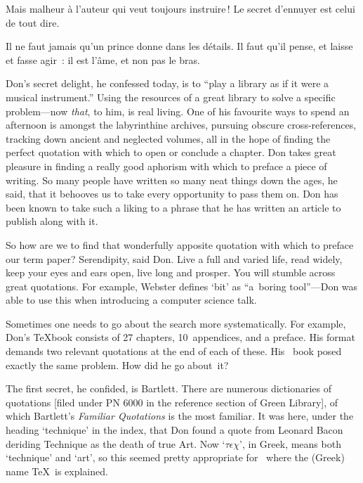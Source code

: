
\smallskip
{\narrower\smallskip\noindent
	Mais malheur \`a l'auteur qui veut toujours instruire$\,$!
	Le secret d'ennuyer est celui de tout dire.
\smallskip}


\smallskip
{\narrower\smallskip\noindent
	Il ne faut jamais qu'un prince donne dans les d\'etails.
	Il faut qu'il pense, et laisse et fasse agir~:
	il est l'\^ame, et non pas le bras.
\smallskip}


\medskip
\noindent
Don's secret delight, he confessed today, is to ``play a library as if
it were a musical instrument.'' Using the resources of a great library
to solve a specific problem---now {\it  that}, to him, is real living.
One of his favourite ways to spend an afternoon is amongst the
labyrinthine archives, pursuing obscure cross-references, tracking down
ancient and neglected volumes, all in the hope of finding the perfect
quotation with which to open or conclude a chapter. Don takes great
pleasure in finding a really good aphorism with which to preface a
piece of writing.  So many people have written so many neat things
down the ages, he said, that it behooves us to take every opportunity
to pass them on. Don has been known to take such a liking to a phrase
that he has written an article to publish along with it.

So how are we to find that wonderfully apposite quotation with which to
preface our term paper? Serendipity, said Don. Live a full and varied
life, read widely, keep your eyes and ears open, live long and prosper.
You will stumble across great quotations. For example, Webster defines
`bit' as ``a~boring tool''---Don was able to use this when
introducing a computer science talk.

Sometimes one needs to go about the search more systematically. For
example, Don's \TeX book consists of 27 chapters, 10~appendices, and a
preface. His format demands two relevant quotations at the end of each
of these. His \MF\ book  posed exactly the same problem. How did he go
about~it?

The first secret, he confided, is Bartlett. There are numerous
dictionaries of quotations [filed under PN 6000 in the reference
section of Green Library], of which Bartlett's {\sl Familiar Quotations\/} is
the most familiar. It was here, under the heading `technique'
in the index, that
Don found a quote from Leonard Bacon deriding Technique as the death
of true Art. 
Now `$\tau\epsilon\chi$',
in Greek, means both `technique' and
`art', so this seemed pretty appropriate for  \TeXbook\ where the (Greek)
name \TeX\ is explained.

